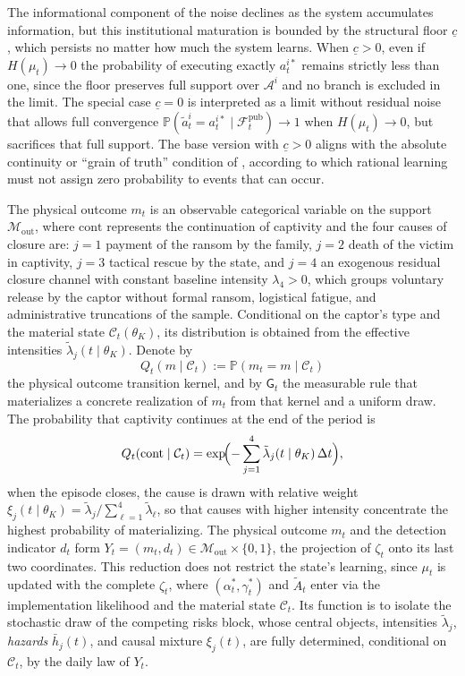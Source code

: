 \documentclass[pdflatex,sn-mathphys-ay]{sn-jnl}
\theoremstyle{plain}
\theoremstyle{definition}
\newcommand{\Prob}{\mathbb{P}}
\newcommand{\1}{\mathbf{1}}
\begin{document}
The informational component of the noise declines as the system accumulates information, but this institutional maturation is bounded by the structural floor $\underline{c}$, which persists no matter how much the system learns. When $\underline{c}>0$, even if $H(\mu_t)\to 0$ the probability of executing exactly $a_t^{i\ast}$ remains strictly less than one, since the floor preserves full support over $\mathcal{A}^i$ and no branch is excluded in the limit. The special case $\underline{c}=0$ is interpreted as a limit without residual noise that allows full convergence $\Prob(\tilde{a}_t^i=a_t^{i\ast}\mid\mathcal{F}_t^{\mathrm{pub}})\to 1$ when $H(\mu_t)\to 0$, but sacrifices that full support. The base version with $\underline{c}>0$ aligns with the absolute continuity or ``grain of truth'' condition of \citet{KalaiLehrer1993}, according to which rational learning must not assign zero probability to events that can occur.

The physical outcome $m_t$ is an observable categorical variable on the support $\mathcal{M}_{\mathrm{out}}$, where $\mathrm{cont}$ represents the continuation of captivity and the four causes of closure are: $j=1$ payment of the ransom by the family, $j=2$ death of the victim in captivity, $j=3$ tactical rescue by the state, and $j=4$ an exogenous residual closure channel with constant baseline intensity $\lambda_4>0$, which groups voluntary release by the captor without formal ransom, logistical fatigue, and administrative truncations of the sample. Conditional on the captor's type and the material state $\mathcal{C}_t(\theta_K)$, its distribution is obtained from the effective intensities $\tilde{\lambda}_j(t\mid\theta_K)$. Denote by
\[
Q_t(m\mid\mathcal{C}_t):=\Prob(m_t=m\mid\mathcal{C}_t)
\]
the physical outcome transition kernel, and by $\mathsf{G}_t$ the measurable rule that materializes a concrete realization of $m_t$ from that kernel and a uniform draw. The probability that captivity continues at the end of the period is
\[
Q_t(\mathrm{cont}\mid\mathcal{C}_t)=\exp\!\Bigl(-\sum_{j=1}^{4}\tilde{\lambda}_j(t\mid\theta_K)\,\Delta t\Bigr),
\]
when the episode closes, the cause is drawn with relative weight $\xi_j(t\mid\theta_K)=\tilde{\lambda}_j/\sum_{\ell=1}^{4}\tilde{\lambda}_\ell$, so that causes with higher intensity concentrate the highest probability of materializing. The physical outcome $m_t$ and the detection indicator $d_t$ form $Y_t=(m_t,d_t)\in\mathcal{M}_{\mathrm{out}}\times\{0,1\}$, the projection of $\zeta_t$ onto its last two coordinates. This reduction does not restrict the state's learning, since $\mu_t$ is updated with the complete $\zeta_t$, where $(\alpha_t^\ast,\gamma_t^\ast)$ and $\tilde{A}_t$ enter via the implementation likelihood and the material state $\mathcal{C}_t$. Its function is to isolate the stochastic draw of the competing risks block, whose central objects, intensities $\tilde{\lambda}_j$, \textit{hazards} $\bar{h}_j(t)$, and causal mixture $\xi_j(t)$, are fully determined, conditional on $\mathcal{C}_t$, by the daily law of $Y_t$.
\end{document}
